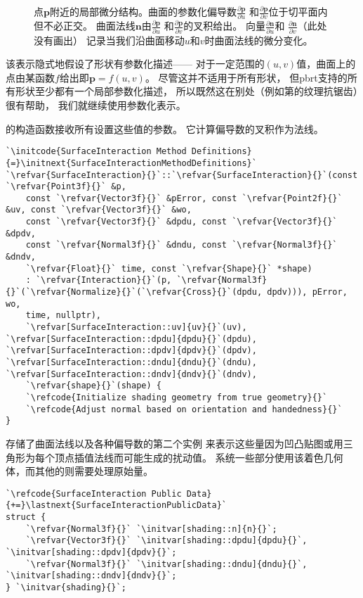 \begin{figure}[htbp]
    \centering
    \caption{点$\bm p$附近的局部微分结构。曲面的参数化偏导数$\displaystyle\frac{\partial \bm p}{\partial u}$
        和$\displaystyle\frac{\partial \bm p}{\partial v}$位于切平面内但不必正交。
        曲面法线$\bm n$由$\displaystyle\frac{\partial \bm p}{\partial u}$
        和$\displaystyle\frac{\partial \bm p}{\partial v}$的叉积给出。
        向量$\displaystyle\frac{\partial \bm n}{\partial u}$和
        $\displaystyle\frac{\partial \bm n}{\partial v}$（此处没有画出）
        记录当我们沿曲面移动$u$和$v$时曲面法线的微分变化。}
    \label{fig:2.19}
\end{figure}

该表示隐式地假设了形状有参数化描述——
对于一定范围的$(u,v)$值，曲面上的点由某函数$f$给出即$\bm p=f(u,v)$。
尽管这并不适用于所有形状，
但pbrt支持的所有形状至少都有一个局部参数化描述，
所以既然这在别处（例如第的纹理抗锯齿）很有帮助，
我们就继续使用参数化表示。

的构造函数接收所有设置这些值的参数。
它计算偏导数的叉积作为法线。
\begin{lstlisting}
`\initcode{SurfaceInteraction Method Definitions}{=}\initnext{SurfaceInteractionMethodDefinitions}`
`\refvar{SurfaceInteraction}{}`::`\refvar{SurfaceInteraction}{}`(const `\refvar{Point3f}{}` &p,
    const `\refvar{Vector3f}{}` &pError, const `\refvar{Point2f}{}` &uv, const `\refvar{Vector3f}{}` &wo,
    const `\refvar{Vector3f}{}` &dpdu, const `\refvar{Vector3f}{}` &dpdv,
    const `\refvar{Normal3f}{}` &dndu, const `\refvar{Normal3f}{}` &dndv,
    `\refvar{Float}{}` time, const `\refvar{Shape}{}` *shape)
    : `\refvar{Interaction}{}`(p, `\refvar{Normal3f}{}`(`\refvar{Normalize}{}`(`\refvar{Cross}{}`(dpdu, dpdv))), pError, wo,
    time, nullptr),
    `\refvar[SurfaceInteraction::uv]{uv}{}`(uv), `\refvar[SurfaceInteraction::dpdu]{dpdu}{}`(dpdu), `\refvar[SurfaceInteraction::dpdv]{dpdv}{}`(dpdv), `\refvar[SurfaceInteraction::dndu]{dndu}{}`(dndu), `\refvar[SurfaceInteraction::dndv]{dndv}{}`(dndv),
    `\refvar{shape}{}`(shape) {
    `\refcode{Initialize shading geometry from true geometry}{}`
    `\refcode{Adjust normal based on orientation and handedness}{}`
}
\end{lstlisting}

存储了曲面法线以及各种偏导数的第二个实例
来表示这些量因为凹凸贴图或用三角形为每个顶点插值法线而可能生成的扰动值。
系统一些部分使用该着色几何体，而其他的则需要处理原始量。
\begin{lstlisting}
`\refcode{SurfaceInteraction Public Data}{+=}\lastnext{SurfaceInteractionPublicData}`
struct {
    `\refvar{Normal3f}{}` `\initvar[shading::n]{n}{}`;
    `\refvar{Vector3f}{}` `\initvar[shading::dpdu]{dpdu}{}`, `\initvar[shading::dpdv]{dpdv}{}`;
    `\refvar{Normal3f}{}` `\initvar[shading::dndu]{dndu}{}`, `\initvar[shading::dndv]{dndv}{}`;
} `\initvar{shading}{}`;
\end{lstlisting}

